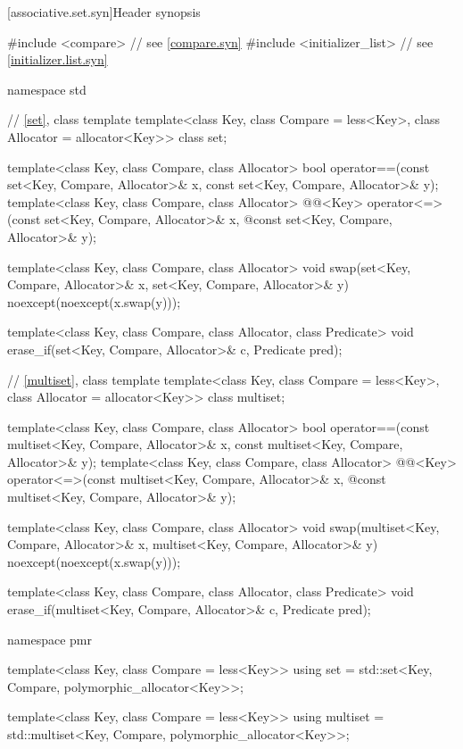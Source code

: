[associative.set.syn]{Header  synopsis}%

%
\begin{codeblock}
#include <compare>              // see \ref{compare.syn}
#include <initializer_list>     // see \ref{initializer.list.syn}

namespace std {
  // \ref{set}, class template 
  template<class Key, class Compare = less<Key>, class Allocator = allocator<Key>>
    class set;

  template<class Key, class Compare, class Allocator>
    bool operator==(const set<Key, Compare, Allocator>& x,
                    const set<Key, Compare, Allocator>& y);
  template<class Key, class Compare, class Allocator>
    @@<Key> operator<=>(const set<Key, Compare, Allocator>& x,
    @\itcorr@                                        const set<Key, Compare, Allocator>& y);

  template<class Key, class Compare, class Allocator>
    void swap(set<Key, Compare, Allocator>& x,
              set<Key, Compare, Allocator>& y)
      noexcept(noexcept(x.swap(y)));

  template<class Key, class Compare, class Allocator, class Predicate>
    void erase_if(set<Key, Compare, Allocator>& c, Predicate pred);

  // \ref{multiset}, class template 
  template<class Key, class Compare = less<Key>, class Allocator = allocator<Key>>
    class multiset;

  template<class Key, class Compare, class Allocator>
    bool operator==(const multiset<Key, Compare, Allocator>& x,
                    const multiset<Key, Compare, Allocator>& y);
  template<class Key, class Compare, class Allocator>
    @@<Key> operator<=>(const multiset<Key, Compare, Allocator>& x,
    @\itcorr@                                        const multiset<Key, Compare, Allocator>& y);

  template<class Key, class Compare, class Allocator>
    void swap(multiset<Key, Compare, Allocator>& x,
              multiset<Key, Compare, Allocator>& y)
      noexcept(noexcept(x.swap(y)));

  template<class Key, class Compare, class Allocator, class Predicate>
    void erase_if(multiset<Key, Compare, Allocator>& c, Predicate pred);

  namespace pmr {
    template<class Key, class Compare = less<Key>>
      using set = std::set<Key, Compare, polymorphic_allocator<Key>>;

    template<class Key, class Compare = less<Key>>
      using multiset = std::multiset<Key, Compare, polymorphic_allocator<Key>>;
  }
}
\end{codeblock}

